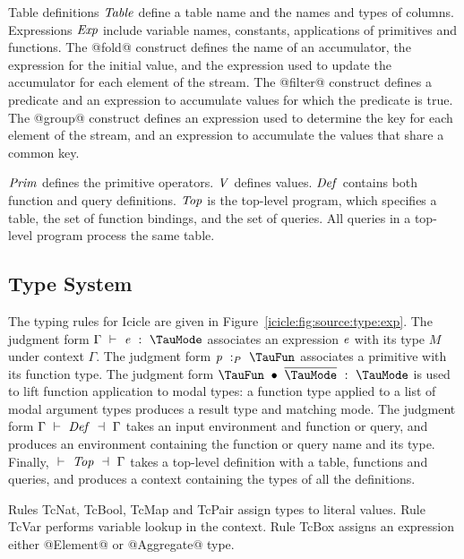 Table definitions $\mathit{Table}$ define a table name and the names and types of columns.
Expressions $\mathit{Exp}$ include variable names, constants, applications of primitives and functions.
The @fold@ construct defines the name of an accumulator, the expression for the initial value, and the expression used to update the accumulator for each element of the stream.
The @filter@ construct defines a predicate and an expression to accumulate values for which the predicate is true.
The @group@ construct defines an expression used to determine the key for each element of the stream, and an expression to accumulate the values that share a common key.

$\mathit{Prim}$ defines the primitive operators.
$\mathit{V}$ defines values.
$\mathit{Def}$ contains both function and query definitions.
$\mathit{Top}$ is the top-level program, which specifies a table, the set of function bindings, and the set of queries.
All queries in a top-level program process the same table.


\subsection{Type System}
\label{icicle:s:ElementsAndAggregates:TypeSystem}



The typing rules for Icicle are given in Figure~\ref{icicle:fig:source:type:exp}.
The judgment form $\Typecheck{\Gamma}{\mi{e}}{\TauMode}$ associates an expression $\mathit{e}$ with its type $M$ under context $\Gamma$.
The judgment form $\TypecheckP{\mi{p}}{\TauFun}$ associates a primitive with its function type.
The judgment form $\TypecheckApp{\TauFun}{\ov{\TauMode}}{\TauMode}$ is used to lift function application to modal types: a function type applied to a list of modal argument types produces a result type and matching mode.
The judgment form $\TypecheckS{\Gamma}{\mi{Def}}{\Gamma}$ takes an input environment and function or query, and produces an environment containing the function or query name and its type.
Finally, $\TypecheckS{}{\mi{Top}}{\Gamma}$ takes a top-level definition with a table, functions and queries, and produces a context containing the types of all the definitions.


Rules TcNat, TcBool, TcMap and TcPair assign types to literal values.
Rule TcVar performs variable lookup in the context.
Rule TcBox assigns an expression either @Element@ or @Aggregate@ type. 

